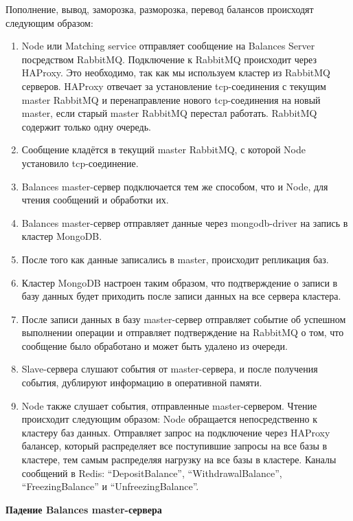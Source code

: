 Пополнение, вывод, заморозка, разморозка, перевод балансов происходят следующим образом:
\begin{enumerate}
    \item Node или Matching service отправляет сообщение на Balances Server посредством RabbitMQ. Подключение к RabbitMQ происходит через HAProxy. Это необходимо, так как мы используем кластер из RabbitMQ серверов. HAProxy отвечает за установление tcp-соединения с текущим master RabbitMQ и перенаправление нового tcp-соединения на новый master, если старый master RabbitMQ перестал работать. RabbitMQ содержит только одну очередь.
    \item Сообщение кладётся в текущий master RabbitMQ, с которой Node установило tcp-соединение.
    \item Balances master-сервер подключается тем же способом, что и Node, для чтения сообщений и обработки их.
    \item Balances master-сервер отправляет данные через mongodb-driver на запись в кластер MongoDB.
    \item После того как данные записались в master, происходит репликация баз.
    \item Кластер MongoDB настроен таким образом, что подтверждение о записи в базу данных будет приходить после записи данных на все сервера кластера.
    \item После записи данных в базу master-сервер отправляет событие об успешном выполнении операции и отправляет подтверждение на RabbitMQ о том, что сообщение было обработано и может быть удалено из очереди.
    \item Slave-сервера слушают события от master-сервера, и после получения события, дублируют информацию в оперативной памяти.
    \item Node также слушает события, отправленные master-сервером. Чтение происходит следующим образом: Node обращается непосредственно к кластеру баз данных. Отправляет запрос на подключение через HAProxy балансер, который распределяет все поступившие запросы на все базы в кластере, тем самым распределяя нагрузку на все базы в кластере. Каналы сообщений в Redis: ``DepositBalance'', ``WithdrawalBalance'', ``FreezingBalance'' и ``UnfreezingBalance''.
\end{enumerate}

\textbf{Падение Balances master-сервера}

